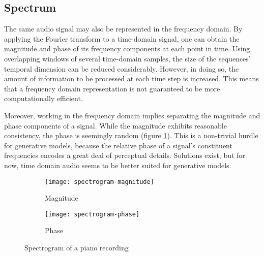 \documentclass[../../report.tex]{subfiles}
\begin{document}
\subsection{Spectrum}

The same audio signal may also be represented in the frequency domain. By
applying the Fourier transform to a time-domain signal, one can obtain the
magnitude and phase of its frequency components at each point in time. Using
overlapping windows of several time-domain samples, the size of the sequences'
temporal dimension can be reduced considerably. However, in doing so, the amount
of information to be processed at each time step is increased. This means that a
frequency domain representation is not guaranteed to be more computationally
efficient. \cite{Dieleman2020}

Moreover, working in the frequency domain implies separating the magnitude and
phase components of a signal. While the magnitude exhibits reasonable
consistency, the phase is seemingly random (figure \ref{fig:spectrogram}). This
is a non-trivial hurdle for generative models, because the relative phase of a
signal's constituent frequencies encodes a great deal of perceptual details.
Solutions exist, but for now, time domain audio seems to be better suited for
generative models. \cite{Dieleman2020}

\begin{figure}
  \centering
  \begin{subfigure}[b]{0.49\textwidth}
    \texttt{[image: spectrogram-magnitude]}
    \caption{Magnitude}
  \end{subfigure}
  \hfill
  \begin{subfigure}[b]{0.49\textwidth}
    \texttt{[image: spectrogram-phase]}
    \caption{Phase}
  \end{subfigure}
  \caption{Spectrogram of a piano recording \cite{Dieleman2020}}
  \label{fig:spectrogram}
\end{figure}
\end{document}
